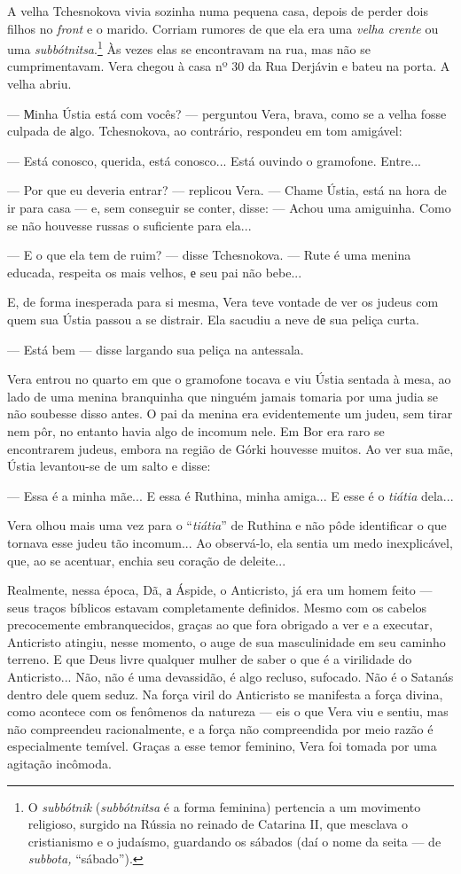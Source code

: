 A velha Tchesnokova vivia sozinha numa pequena casa, depois de perder
dois filhos no \emph{front} e o marido. Corriam rumores de que ela era
uma \emph{velha crente} ou uma \emph{subbótnitsa}.\footnote{O
  \emph{subbótnik} (\emph{subbótnitsa} é a forma feminina) pertencia a
  um movimento religioso, surgido na Rússia no reinado de Catarina II,
  que mesclava o cristianismo e o judaísmo, guardando os sábados (daí o
  nome da seita --- de \emph{subbota,} ``sábado'').} Às vezes elas se
encontravam na rua, mas não se cumprimentavam. Vera chegou à casa nº 30
da Rua Derjávin e bateu na porta. A velha abriu.

--- Мinha Ústia está com vocês? --- perguntou Vera, brava, como se a
velha fosse culpada de аlgo. Tchesnokova, ao contrário, respondeu em tom
amigável:

--- Está conosco, querida, está conosco... Está ouvindo o gramofone.
Entre...

--- Por que eu deveria entrar? --- replicou Vera. --- Chame Ústia, está
na hora de ir para casa --- e, sem conseguir se conter, disse: --- Achou
uma amiguinha. Como se não houvesse russas o suficiente para ela...

--- E o que ela tem de ruim? --- disse Tchesnokova. --- Rute é uma
menina educada, respeita os mais velhos, е seu pai não bebe...

E, de forma inesperada para si mesma, Vera teve vontade de ver os judeus
com quem sua Ústia passou a se distrair. Ela sacudiu a neve dе sua
peliça curta.

--- Está bem --- disse largando sua peliça na antessala.

Vera entrou no quarto em que o gramofone tocava e viu Ústia sentada à
mesa, ao lado de uma menina branquinha que ninguém jamais tomaria por
uma judia se não soubesse disso antes. O pai da menina era evidentemente
um judeu, sem tirar nem pôr, no entanto havia algo de incomum nele. Em
Bor era raro se encontrarem judeus, embora na região de Górki houvesse
muitos. Ao ver sua mãe, Ústia levantou-se de um salto e disse:

--- Essa é a minha mãe... E essa é Ruthina, minha amiga... E esse é o
\emph{tiátia} dela...

Vera olhou mais uma vez para o ``\emph{tiátia}'' de Ruthina e não pôde
identificar o que tornava esse judeu tão incomum... Ao observá-lo, ela
sentia um medo inexplicável, que, ao se acentuar, enchia seu coração de
deleite...

Realmente, nessa época, Dã, а Áspide, o Anticristo, já era um homem
feito --- seus traços bíblicos estavam completamente definidos. Mesmo
com os cabelos precocemente embranquecidos, graças ao que fora obrigado
a ver e a executar, Anticristo atingiu, nesse momento, o auge de sua
masculinidade em seu caminho terreno. E que Deus livre qualquer mulher
de saber o que é a virilidade do Anticristo... Não, não é uma
devassidão, é algo recluso, sufocado. Não é o Satanás dentro dele quem
seduz. Na força viril do Anticristo se manifesta a força divina, como
acontece com os fenômenos da natureza --- eis o que Vera viu e sentiu,
mas não compreendeu racionalmente, e a força não compreendida por meio
razão é especialmente temível. Graças a esse temor feminino, Vera foi
tomada por uma agitação incômoda.

